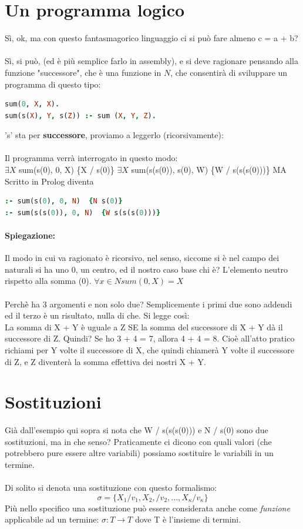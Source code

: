 \documentclass[12pt, a4paper, openany, oneside]{book}
\begin{document}
\section{Un programma logico}
Sì, ok, ma con questo fantasmagorico linguaggio ci si può fare almeno c = a + b?
\\ \\
Sì, si può, (ed è più semplice farlo in assembly), e si deve ragionare pensando
alla funzione "successore", che è una funzione in $N$, che consentirà di 
sviluppare un programma di questo tipo:
\begin{lstlisting}[language=prolog]
sum(0, X, X).
sum(s(X), Y, s(Z)) :- sum (X, Y, Z).
\end{lstlisting} 
's' sta per \textbf{successore}, proviamo a leggerlo (ricorsivamente): \\ \\
Il programma verrà interrogato in questo modo: \\
$\exists X$ sum(s(0), 0, X) \{X / s(0)\}
$\exists X$ sum(s(s(0)), s(0), W) \{W / s(s(s(0)))\} MA
Scritto in Prolog diventa
\begin{lstlisting}[language=prolog]
:- sum(s(0), 0, N)  {N s(0)}
:- sum(s(s(0)), 0, N)  {W s(s(s(0)))}
\end{lstlisting}
\paragraph{Spiegazione: } Il modo in cui va ragionato è ricorsivo, nel senso, 
siccome si è nel campo dei naturali si ha uno 0, un centro, ed il nostro caso
base chi è? L'elemento neutro rispetto alla somma (0). 
$\forall x \in N sum(0, X) = X$ \\ \\
Perchè ha 3 argomenti e non solo due? Semplicemente i primi due sono addendi ed 
il terzo è un risultato, nulla di che. Si legge così: \\
La somma di X + Y è uguale a Z SE la somma del successore di X + Y dà il successore di Z.
Quindi? Se ho 3 + 4 = 7, allora 4 + 4 = 8. Cioè all'atto pratico richiami per Y
volte il successore di X, che quindi chiamerà Y volte il successore di Z, e Z
diventerà la somma effettiva dei nostri X + Y.
\section{Sostituzioni}
Già dall'esempio qui sopra si nota che {W / s(s(s(0)))} e {N / s(0)} sono due
sostituzioni, ma in che senso? Praticamente ci dicono con quali valori (che 
potrebbero pure essere altre variabili) possiamo sostituire le variabili in un 
termine. \\ \\
Di solito si denota una sostituzione con questo formalismo:
\[
\sigma = \{ X_{1} / v_{1}, X_{2}, / v_{2}, ... , X_{\kappa} / v_{\kappa}\}
\]
Più nello specifico una sostituzione può essere considerata anche come 
\textit{funzione} applicabile ad un termine: $\sigma : T \to T$ dove T è l'insieme
di termini. \\ 
\end{document}
